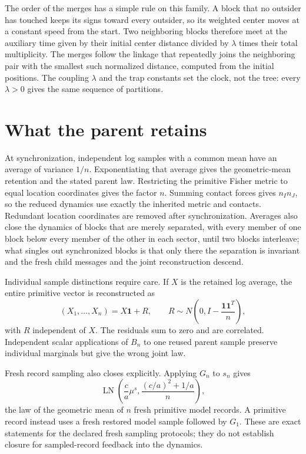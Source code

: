 The order of the merges has a simple rule on this family. A block that no outsider has touched keeps its signs toward every outsider, so its weighted center moves at a constant speed from the start. Two neighboring blocks therefore meet at the auxiliary time given by their initial center distance divided by $\lambda$ times their total multiplicity. The merges follow the linkage that repeatedly joins the neighboring pair with the smallest such normalized distance, computed from the initial positions. The coupling $\lambda$ and the trap constants set the clock, not the tree: every $\lambda>0$ gives the same sequence of partitions.

\section{What the parent retains}

At synchronization, independent log samples with a common mean have an average of variance $1/n$. Exponentiating that average gives the geometric-mean retention and the stated parent law. Restricting the primitive Fisher metric to equal location coordinates gives the factor $n$. Summing contact forces gives $n_In_J$, so the reduced dynamics use exactly the inherited metric and contacts. Redundant location coordinates are removed after synchronization. Averages also close the dynamics of blocks that are merely separated, with every member of one block below every member of the other in each sector, until two blocks interleave; what singles out synchronized blocks is that only there the separation is invariant and the fresh child messages and the joint reconstruction descend.

Individual sample distinctions require care. If $X$ is the retained log average, the entire primitive vector is reconstructed as
\begin{equation}
(X_1,\ldots,X_n)=X\mathbf1+R,\qquad
R\sim N\left(0,I-\frac{\mathbf1\mathbf1^T}{n}\right),
\end{equation}
with $R$ independent of $X$. The residuals sum to zero and are correlated. Independent scalar applications of $B_n$ to one reused parent sample preserve individual marginals but give the wrong joint law.

Fresh record sampling also closes explicitly. Applying $G_n$ to $s_n$ gives
\begin{equation}
\operatorname{LN}\left(\frac ca\mu^s,
\frac{(c/a)^2+1/a}{n}\right),
\end{equation}
the law of the geometric mean of $n$ fresh primitive model records. A primitive record instead uses a fresh restored model sample followed by $G_1$. These are exact statements for the declared fresh sampling protocols; they do not establish closure for sampled-record feedback into the dynamics.

